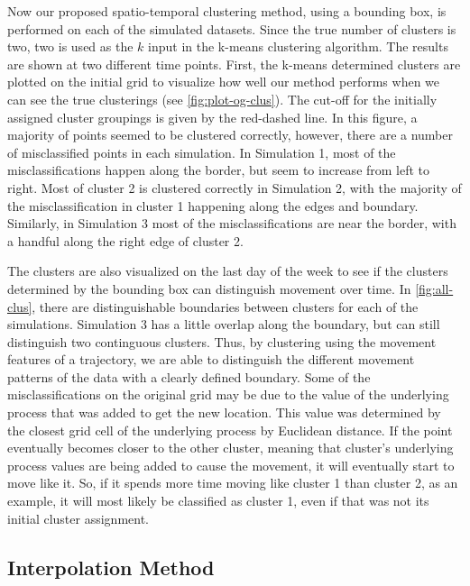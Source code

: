 \documentclass[12pt]{article}
\begin{document}
Now our proposed spatio-temporal clustering method, using a bounding
box, is performed on each of the simulated datasets. Since the true
number of clusters is two, two is used as the \(k\) input in the k-means
clustering algorithm. The results are shown at two different time
points. First, the k-means determined clusters are plotted on the
initial grid to visualize how well our method performs when we can see
the true clusterings (see \cref{fig:plot-og-clus}). The cut-off for the
initially assigned cluster groupings is given by the red-dashed line. In
this figure, a majority of points seemed to be clustered correctly,
however, there are a number of misclassified points in each simulation.
In Simulation 1, most of the misclassifications happen along the border,
but seem to increase from left to right. Most of cluster 2 is clustered
correctly in Simulation 2, with the majority of the misclassification in
cluster 1 happening along the edges and boundary. Similarly, in
Simulation 3 most of the misclassifications are near the border, with a
handful along the right edge of cluster 2.

The clusters are also visualized on the last day of the week to see if
the clusters determined by the bounding box can distinguish movement
over time. In \cref{fig:all-clus}, there are distinguishable boundaries
between clusters for each of the simulations. Simulation 3 has a little
overlap along the boundary, but can still distinguish two continguous
clusters. Thus, by clustering using the movement features of a
trajectory, we are able to distinguish the different movement patterns
of the data with a clearly defined boundary. Some of the
misclassifications on the original grid may be due to the value of the
underlying process that was added to get the new location. This value
was determined by the closest grid cell of the underlying process by
Euclidean distance. If the point eventually becomes closer to the other
cluster, meaning that cluster's underlying process values are being
added to cause the movement, it will eventually start to move like it.
So, if it spends more time moving like cluster 1 than cluster 2, as an
example, it will most likely be classified as cluster 1, even if that
was not its initial cluster assignment.

\hypertarget{interpolation-method}{%
\subsection{Interpolation Method}\label{interpolation-method}}
\end{document}
